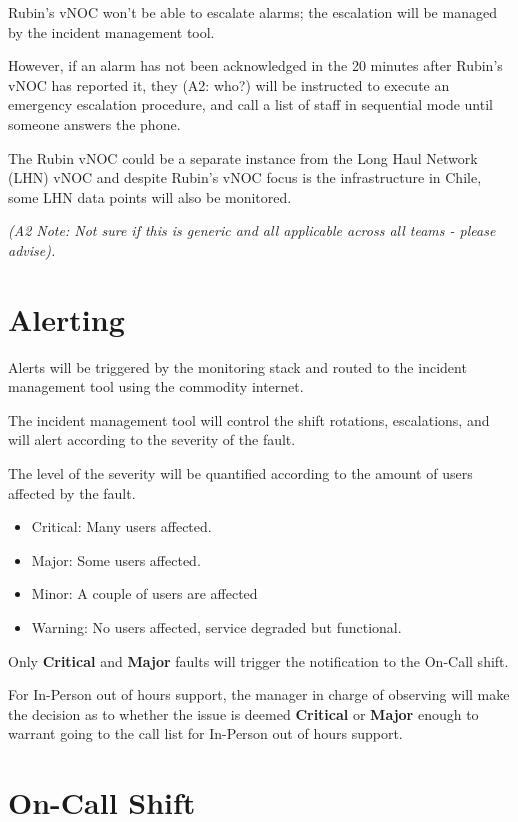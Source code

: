 Rubin's vNOC won't be able to escalate alarms; the escalation will be managed by the incident management tool.

However, if an alarm has not been acknowledged in the 20 minutes after Rubin's vNOC has reported it, they (A2: who?) will be instructed to execute an emergency escalation procedure, and call a list of staff in sequential mode until someone answers the phone.

The Rubin vNOC could be a separate instance from the Long Haul Network (LHN) vNOC and despite Rubin's vNOC focus is the infrastructure in Chile, some LHN data points will also be monitored.

\textit{
(A2 Note:  Not sure if this is generic and all applicable across all teams - please advise).}

\section{Alerting}

Alerts will be triggered by the monitoring stack and routed to the incident management tool using the commodity internet.

The incident management tool will control the shift rotations, escalations, and will alert according to the severity of the fault.

The level of the severity will be quantified according to the amount of users affected by the fault.

\begin{itemize}
    \item Critical: Many users affected.
    \item Major: Some users affected.
    \item Minor: A couple of users are affected
    \item Warning: No users affected, service degraded but functional.
\end{itemize}

Only \textbf{Critical} and \textbf{Major} faults will trigger the notification to the On-Call shift.

For In-Person out of hours support, the manager in charge of observing will make the decision as to whether the issue is deemed \textbf{Critical} or \textbf{Major} enough to warrant going to the call list for In-Person out of hours support.


\section{On-Call Shift}

